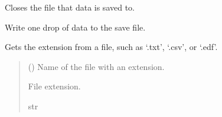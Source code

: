 \documentclass[letterpaper,10pt,english]{sphinxmanual}
\begin{document}
\begin{fulllineitems}

\begin{fulllineitems}
\label{\detokenize{PodApi.Stream.Drain:PodApi.Stream.Drain.ToFile.DrainToFile.CloseFile}}
\pysigstartsignatures
{}
\pysigstopsignatures
\sphinxAtStartPar
Closes the file that data is saved to.

\end{fulllineitems}


\begin{fulllineitems}
\label{\detokenize{PodApi.Stream.Drain:PodApi.Stream.Drain.ToFile.DrainToFile.DrainDropToFile}}
\pysigstartsignatures
{}
\pysigstopsignatures
\sphinxAtStartPar
Write one drop of data to the save file.

\end{fulllineitems}


\begin{fulllineitems}
\label{\detokenize{PodApi.Stream.Drain:PodApi.Stream.Drain.ToFile.DrainToFile.GetExtension}}
\pysigstartsignatures
{}
\pysigstopsignatures
\sphinxAtStartPar
Gets the extension from a file, such as ‘.txt’, ‘.csv’, or ‘.edf’.
\begin{quote}\begin{description}
\sphinxAtStartPar
{} () \textendash{} Name of the file with an extension.

\sphinxAtStartPar
File extension.

\sphinxAtStartPar
str


\end{description}
\end{quote}
\end{fulllineitems}
\end{fulllineitems}
\end{document}

